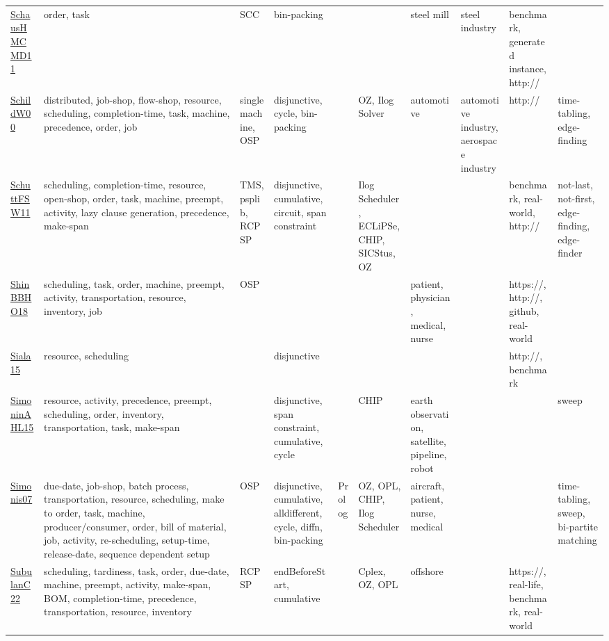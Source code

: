 {\begin{longtable}{p{3cm}p{4cm}p{2cm}p{2cm}p{2cm}p{2cm}p{2cm}p{2cm}p{2cm}p{2cm}}
\href{articles/SchausHMCMD11.pdf}{SchausHMCMD11}~\cite{SchausHMCMD11} & order, task & SCC & bin-packing &  &  & steel mill & steel industry & benchmark, generated instance, http:// & \\
\href{articles/SchildW00.pdf}{SchildW00}~\cite{SchildW00} & distributed, job-shop, flow-shop, resource, scheduling, completion-time, task, machine, precedence, order, job & single machine, OSP & disjunctive, cycle, bin-packing &  & OZ, Ilog Solver & automotive & automotive industry, aerospace industry & http:// & time-tabling, edge-finding\\
\href{articles/SchuttFSW11.pdf}{SchuttFSW11}~\cite{SchuttFSW11} & scheduling, completion-time, resource, open-shop, order, task, machine, preempt, activity, lazy clause generation, precedence, make-span & TMS, psplib, RCPSP & disjunctive, cumulative, circuit, span constraint &  & Ilog Scheduler, ECLiPSe, CHIP, SICStus, OZ &  &  & benchmark, real-world, http:// & not-last, not-first, edge-finding, edge-finder\\
\href{articles/ShinBBHO18.pdf}{ShinBBHO18}~\cite{ShinBBHO18} & scheduling, task, order, machine, preempt, activity, transportation, resource, inventory, job & OSP &  &  &  & patient, physician, medical, nurse &  & https://, http://, github, real-world & \\
\href{articles/Siala15.pdf}{Siala15}~\cite{Siala15} & resource, scheduling &  & disjunctive &  &  &  &  & http://, benchmark & \\
\href{articles/SimoninAHL15.pdf}{SimoninAHL15}~\cite{SimoninAHL15} & resource, activity, precedence, preempt, scheduling, order, inventory, transportation, task, make-span &  & disjunctive, span constraint, cumulative, cycle &  & CHIP & earth observation, satellite, pipeline, robot &  &  & sweep\\
\href{articles/Simonis07.pdf}{Simonis07}~\cite{Simonis07} & due-date, job-shop, batch process, transportation, resource, scheduling, make to order, task, machine, producer/consumer, order, bill of material, job, activity, re-scheduling, setup-time, release-date, sequence dependent setup & OSP & disjunctive, cumulative, alldifferent, cycle, diffn, bin-packing & Prolog & OZ, OPL, CHIP, Ilog Scheduler & aircraft, patient, nurse, medical &  &  & time-tabling, sweep, bi-partite matching\\
\href{articles/SubulanC22.pdf}{SubulanC22}~\cite{SubulanC22} & scheduling, tardiness, task, order, due-date, machine, preempt, activity, make-span, BOM, completion-time, precedence, transportation, resource, inventory & RCPSP & endBeforeStart, cumulative &  & Cplex, OZ, OPL & offshore &  & https://, real-life, benchmark, real-world & \\

\end{longtable}}

